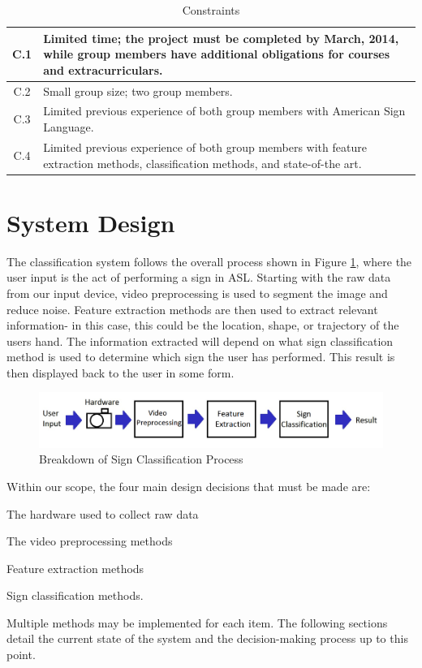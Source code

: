 \documentclass[12pt]{article}
\begin{document}
\begin{table}[h!]
\centering
\caption{Constraints}
\label{table:Constraints}
\vspace{1em}
\begin{tabular}{|c| p{14cm} |}
	\hline
	C.1 & Limited time; the project must be completed by March, 2014, while group members have additional obligations for courses and extracurriculars. \\ \hline
	C.2 & Small group size; two group members. \\ \hline
	C.3 & Limited previous experience of both group members with American Sign Language. \\  \hline
	C.4 & Limited previous experience of both group members with feature extraction methods, classification methods, and state-of-the art. \\ \hline
\end{tabular}
\end{table}

\newpage
\section{System Design}
The classification system follows the overall process shown in Figure \ref{fig:Process}, where the user input is the act of performing a sign in ASL. Starting with the raw data from our input device, video preprocessing is used to segment the image and reduce noise. Feature extraction methods are then used to extract relevant information- in this case, this could be the location, shape, or trajectory of the users hand. The information extracted will depend on what sign classification method is used to determine which sign the user has performed. This result is then displayed back to the user in some form.

\begin{figure}[h!]
  \centering
  \includegraphics[scale=1]{Process.png}
  \caption{Breakdown of Sign Classification Process}
  \label{fig:Process}
\end{figure}

Within our scope, the four main design decisions that must be made are:
\begin{enumerate*}
	\item The hardware used to collect raw data 
	\item The video preprocessing methods 
	\item Feature extraction methods 
	\item Sign classification methods. 
\end{enumerate*}
Multiple methods may be implemented for each item. The following sections detail the current state of the system and the decision-making process up to this point.
\end{document}
